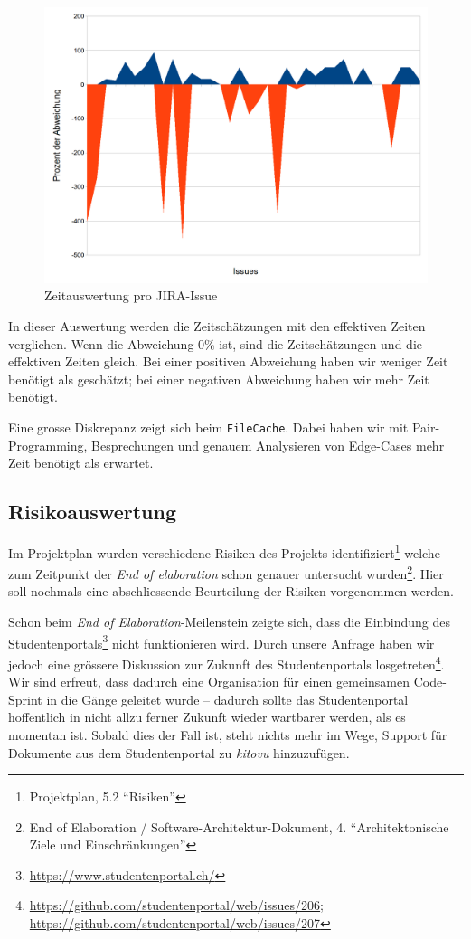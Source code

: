 \documentclass[a4paper]{article}
\begin{document}
\begin{figure}[H]
  \includegraphics[width=\linewidth]{./img/time_per_issue.png}
  \caption{Zeitauswertung pro JIRA-Issue\protect\footnotemark}
\end{figure}

In dieser Auswertung werden die Zeitschätzungen mit den effektiven Zeiten verglichen.
Wenn die Abweichung 0\% ist, sind die Zeitschätzungen und die effektiven Zeiten gleich.
Bei einer positiven Abweichung haben wir weniger Zeit benötigt als geschätzt;
bei einer negativen Abweichung haben wir mehr Zeit benötigt.

Eine grosse Diskrepanz zeigt sich beim \verb|FileCache|.
Dabei haben wir mit Pair-Programming, Besprechungen und genauem Analysieren von Edge-Cases mehr Zeit benötigt als erwartet.

\subsection{Risikoauswertung}

Im Projektplan wurden verschiedene Risiken des Projekts
identifiziert\footnote{Projektplan, 5.2 ``Risiken''} welche zum Zeitpunkt der
\emph{End of elaboration} schon genauer untersucht wurden\footnote{End of
Elaboration / Software-Architektur-Dokument, 4. ``Architektonische Ziele und
Einschränkungen''}. Hier soll nochmals eine abschliessende Beurteilung der
Risiken vorgenommen werden.

Schon beim \emph{End of Elaboration}-Meilenstein zeigte sich, dass die
Einbindung des Studentenportals\footnote{\url{https://www.studentenportal.ch/}}
nicht funktionieren wird. Durch unsere Anfrage haben wir jedoch eine grössere
Diskussion zur Zukunft des Studentenportals
losgetreten\footnote{\url{https://github.com/studentenportal/web/issues/206}; \\
\url{https://github.com/studentenportal/web/issues/207}}. Wir sind erfreut, dass
dadurch eine Organisation für einen gemeinsamen Code-Sprint in die Gänge
geleitet wurde -- dadurch sollte das Studentenportal hoffentlich in nicht allzu
ferner Zukunft wieder wartbarer werden, als es momentan ist. Sobald dies der
Fall ist, steht nichts mehr im Wege, Support für Dokumente aus dem
Studentenportal zu \emph{kitovu} hinzuzufügen.
\end{document}

